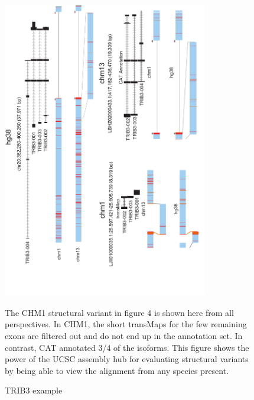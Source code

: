 \documentclass[fleqn,10pt]{wlscirep}
\begin{document}
\begin{figure}
\centering
\includegraphics[width=0.8\textwidth,height=0.7\textheight,keepaspectratio]{trib3_full.pdf}
\caption{TRIB3 example}
The CHM1 structural variant in figure 4 is shown here from all perspectives. In CHM1, the short transMaps for the few remaining exons are filtered out and do not end up in the annotation set. In contrast, CAT annotated 3/4 of the isoforms. This figure shows the power of the UCSC assembly hub for evaluating structural variants by being able to view the alignment from any species present.
\label{supp_fig:trib3}
\end{figure}
\end{document}
